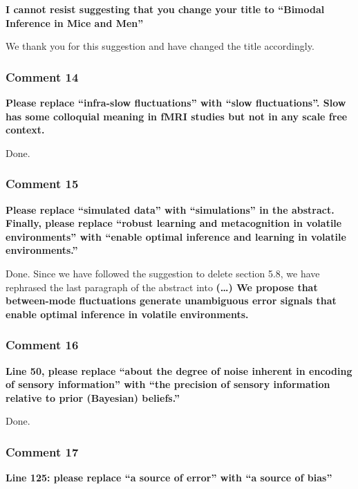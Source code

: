 \documentclass[
]{article}
\begin{document}
\textbf{I cannot resist suggesting that you change your title to
``Bimodal Inference in Mice and Men''}

We thank you for this suggestion and have changed the title accordingly.

\hypertarget{comment-14}{%
\subsubsection{Comment 14}\label{comment-14}}

\textbf{Please replace ``infra-slow fluctuations'' with ``slow
fluctuations''. Slow has some colloquial meaning in fMRI studies but not
in any scale free context.}

Done.

\hypertarget{comment-15}{%
\subsubsection{Comment 15}\label{comment-15}}

\textbf{Please replace ``simulated data'' with ``simulations'' in the
abstract. Finally, please replace ``robust learning and metacognition in
volatile environments'' with ``enable optimal inference and learning in
volatile environments.''}

Done. Since we have followed the suggestion to delete section 5.8, we
have rephrased the last paragraph of the abstract into \textbf{(\ldots)
We propose that between-mode fluctuations generate unambiguous error
signals that enable optimal inference in volatile environments.}

\hypertarget{comment-16}{%
\subsubsection{Comment 16}\label{comment-16}}

\textbf{Line 50, please replace ``about the degree of noise inherent in
encoding of sensory information'' with ``the precision of sensory
information relative to prior (Bayesian) beliefs.''}

Done.

\hypertarget{comment-17}{%
\subsubsection{Comment 17}\label{comment-17}}

\textbf{Line 125: please replace ``a source of error'' with ``a source
of bias''}
\end{document}
